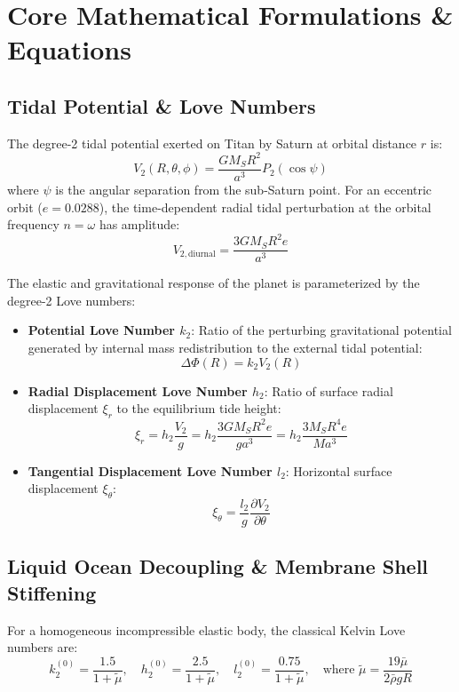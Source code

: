 \documentclass[11pt,a4paper]{article}
\begin{document}
\section{Core Mathematical Formulations \& Equations}

\subsection{Tidal Potential \& Love Numbers}
The degree-2 tidal potential exerted on Titan by Saturn at orbital distance $r$ is:
\begin{equation}
V_2(R, \theta, \phi) = \frac{G M_S R^2}{a^3} P_2(\cos \psi)
\end{equation}
where $\psi$ is the angular separation from the sub-Saturn point. For an eccentric orbit ($e = 0.0288$), the time-dependent radial tidal perturbation at the orbital frequency $n = \omega$ has amplitude:
\begin{equation}
V_{2,\text{diurnal}} = \frac{3 G M_S R^2 e}{a^3}
\end{equation}

The elastic and gravitational response of the planet is parameterized by the degree-2 Love numbers:
\begin{itemize}
    \item \textbf{Potential Love Number $k_2$}: Ratio of the perturbing gravitational potential generated by internal mass redistribution to the external tidal potential:
    \begin{equation}
    \Delta \Phi(R) = k_2 V_2(R)
    \end{equation}
    \item \textbf{Radial Displacement Love Number $h_2$}: Ratio of surface radial displacement $\xi_r$ to the equilibrium tide height:
    \begin{equation}
    \xi_r = h_2 \frac{V_2}{g} = h_2 \frac{3 G M_S R^2 e}{g a^3} = h_2 \frac{3 M_S R^4 e}{M a^3}
    \end{equation}
    \item \textbf{Tangential Displacement Love Number $l_2$}: Horizontal surface displacement $\xi_\theta$:
    \begin{equation}
    \xi_\theta = \frac{l_2}{g} \frac{\partial V_2}{\partial \theta}
    \end{equation}
\end{itemize}

\subsection{Liquid Ocean Decoupling \& Membrane Shell Stiffening}
For a homogeneous incompressible elastic body, the classical Kelvin Love numbers are:
\begin{equation}
k_2^{(0)} = \frac{1.5}{1 + \tilde{\mu}}, \quad h_2^{(0)} = \frac{2.5}{1 + \tilde{\mu}}, \quad l_2^{(0)} = \frac{0.75}{1 + \tilde{\mu}}, \quad \text{where } \tilde{\mu} = \frac{19 \bar{\mu}}{2 \bar{\rho} g R}
\end{equation}
\end{document}
